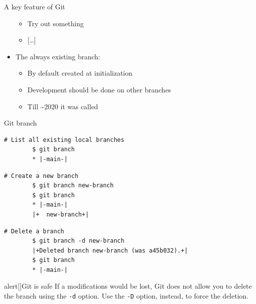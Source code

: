 \documentclass[usenames,svgnames,14pt]{beamer}
\begin{document}
\begin{frame}[label=current]{A key feature of Git}
\begin{overlayarea}{\textwidth}{0.7\textheight}
\begin{itemize}
\begin{itemize}
                      \item Try out something
                      \item {}[\ldots]
                  \end{itemize}
            \item<2-> The always existing \;\; branch:
                  \begin{itemize}
                      \item By default created at initialization
                      \item Development should be done on other branches
                      \item Till \textasciitilde2020 it was called \;
                  \end{itemize}
        \end{itemize}
    \end{overlayarea}
\end{frame}
\begin{frame}[fragile]{Git branch}
    \begin{lstlisting}[style=MyBash]
        # List all existing local branches
        $ git branch
        * |-main-|
    \end{lstlisting}
    \begin{lstlisting}[style=MyBash]
        # Create a new branch
        $ git branch new-branch
        $ git branch
        * |-main-|
        |+  new-branch+|
    \end{lstlisting}
    \begin{lstlisting}[style=MyBash]
        # Delete a branch
        $ git branch -d new-branch
        |+Deleted branch new-branch (was a45b032).+|
        $ git branch
        * |-main-|
    \end{lstlisting}
    \begin{varblock}{alert}[\textwidth]{Git is safe}
        \small
        If a modifications would be lost, Git does not allow you to delete the branch using the \texttt{-d} option.
        Use the \texttt{-D} option, instead, to force the deletion.
    \end{varblock}
\end{frame}
\end{document}
